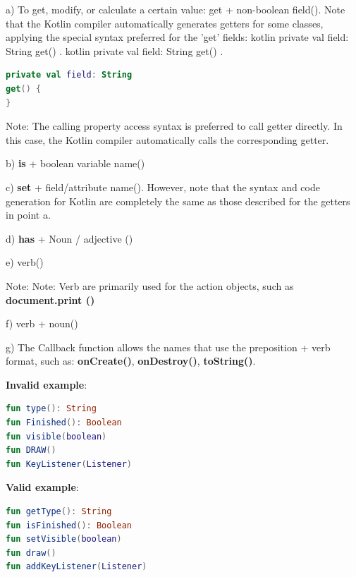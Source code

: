 {{{{{{{{a) To get, modify, or calculate a certain value: get + non-boolean field(). Note that the Kotlin compiler automatically generates getters for some classes, applying the special syntax preferred for the 'get' fields: kotlin private val field: String get() { }. kotlin private val field: String get() { }.

\begin{lstlisting}[language=Kotlin]
private val field: String
get() {
}
\end{lstlisting}
Note: The calling property access syntax is preferred to call getter directly. In this case, the Kotlin compiler automatically calls the corresponding getter.



b) \textbf{is} + boolean variable name()



c) \textbf{set} + field/attribute name(). However, note that the syntax and code generation for Kotlin are completely the same as those described for the getters in point a.



d) \textbf{has} + Noun / adjective ()



e) verb()

Note: Note: Verb are primarily used for the action objects, such as \textbf{document.print ()}



f) verb + noun() 



g) The Callback function allows the names that use the preposition + verb format, such as: \textbf{onCreate()}, \textbf{onDestroy()}, \textbf{toString()}.



\textbf{Invalid example}: 



\begin{lstlisting}[language=Kotlin]
fun type(): String
fun Finished(): Boolean
fun visible(boolean)
fun DRAW()
fun KeyListener(Listener)
\end{lstlisting}


\textbf{Valid example}: 



\begin{lstlisting}[language=Kotlin]
fun getType(): String
fun isFinished(): Boolean
fun setVisible(boolean)
fun draw()
fun addKeyListener(Listener)
\end{lstlisting}


}}}}}}}}

